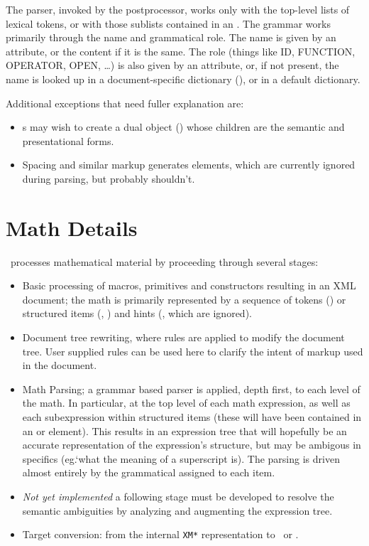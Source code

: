 \documentclass{report}
\begin{document}
The parser, invoked by the postprocessor, works only with the top-level lists of lexical tokens,
or with those sublists contained in an .  The grammar works primarily through
the name and grammatical role.  The name is given by an attribute, or the content if it is
the same.  The role (things like ID, FUNCTION, OPERATOR, OPEN, \ldots) is also given
by an attribute, or, if not present, the name is looked up in a document-specific
dictionary (), or in a default dictionary.

Additional exceptions that need fuller explanation are: 
\begin{itemize}
 \item {}s may wish to create a dual object () whose children are 
the semantic and presentational forms.
 \item Spacing and similar markup generates  elements, which are currently ignored
during parsing, but probably shouldn't.
\end{itemize}

\section{Math Details}\label{math.details}
\LaTeXML\ processes mathematical material by proceeding through several stages:
\begin{itemize}
\item Basic processing of macros, primitives and constructors resulting in
   an XML document; the math is primarily represented by a sequence of
   tokens () or structured items (, ) and
   hints (, which are ignored).
\item Document tree rewriting, where rules are applied to modify the document tree.
   User supplied rules can be used here to clarify the intent of markup used in the document.
\item Math Parsing; a grammar based parser is applied, depth first, to each level of the math.
   In particular, at the top level of each math expression, as well as each
   subexpression within structured items (these will have been contained in
   an  or  element).  This results in an expression tree
   that will hopefully be an accurate representation of the expression's structure,
   but may be ambigous in specifics (eg.`what the meaning of a superscript is).
   The parsing is driven almost entirely by the grammatical  assigned
   to each item.
\item \emph{Not yet implemented} a following stage must be developed to resolve
   the semantic ambiguities by analyzing and augmenting the expression tree.
\item Target conversion: from the internal \texttt{XM*} representation to
   \MathML\ or \OpenMath.
\end{itemize}
\end{document}

